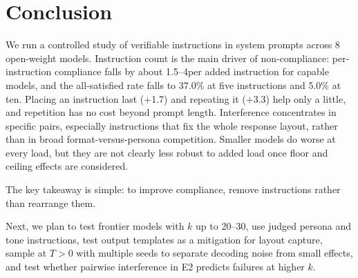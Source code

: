 \section{Conclusion}
\label{sec:conclusion}

We run a controlled study of verifiable instructions in system prompts across 8 open-weight models. Instruction count is the main driver of non-compliance: per-instruction compliance falls by about 1.5--4\pp per added instruction for capable models, and the all-satisfied rate falls to 37.0\% at five instructions and 5.0\% at ten. Placing an instruction last (+1.7\pp) and repeating it (+3.3\pp) help only a little, and repetition has no cost beyond prompt length. Interference concentrates in specific pairs, especially instructions that fix the whole response layout, rather than in broad format-versus-persona competition. Smaller models do worse at every load, but they are not clearly less robust to added load once floor and ceiling effects are considered.

The key takeaway is simple: to improve compliance, remove instructions rather than rearrange them.

Next, we plan to test frontier models with $k$ up to 20--30, use judged persona and tone instructions, test output templates as a mitigation for layout capture, sample at $T>0$ with multiple seeds to separate decoding noise from small effects, and test whether pairwise interference in E2 predicts failures at higher $k$.
